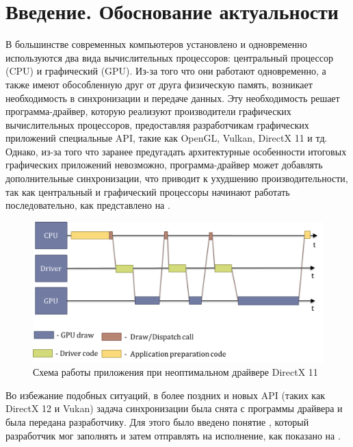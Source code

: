 \chapter*{Введение. Обоснование актуальности} %

В большинстве современных компьютеров установлено и одновременно используются два вида вычислительных процессоров: центральный процессор (CPU) и графический (GPU). Из-за того что они работают одновременно, а также имеют обособленную друг от друга физическую память, возникает необходимость в синхронизации и передаче данных. Эту необходимость решает программа-драйвер, которую реализуют производители графических вычислительных процессоров, предоставляя разработчикам графических приложений специальные API, такие как OpenGL, Vulkan, DirectX 11 и тд. Однако, из-за того что заранее предугадать архитектурные особенности итоговых графических приложений невозможно, программа-драйвер может добавлять дополнительные синхронизации, что приводит к ухудшению производительности, так как центральный и графический процессоры начинают работать последовательно, как представлено на .

\begin{figure}[ht!] 
	\center
	\includegraphics [scale=0.23] {my_folder/images//pipeline_dx11}
	\caption{Схема работы приложения при неоптимальном драйвере DirectX 11} 
	\label{fig:pipeline_dx11}  
\end{figure}

Во избежание подобных ситуаций, в более поздних и новых API (таких как DirectX 12 и Vukan) задача синхронизации была снята с программы драйвера и была передана разработчику. Для этого было введено понятие , который разработчик мог заполнять и затем отправлять на исполнение, как показано на .

